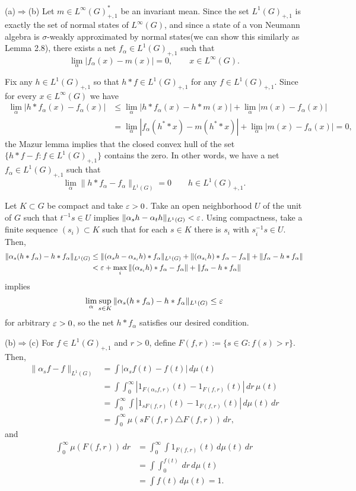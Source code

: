\documentclass{../../../small}
\begin{document}
\begin{pf}
(a)$\Rightarrow$(b)
Let $m\in L^\infty(G)^*_{+,1}$ be an invariant mean.
Since the set $L^1(G)_{+,1}$ is exactly the set of normal states of $L^\infty(G)$, and since a state of a von Neumann algebra is $\sigma$-weakly approximated by normal states(we can show this similarly as Lemma 2.8), there exists a net $f_\alpha\in L^1(G)_{+,1}$ such that
\[\lim_\alpha|f_\alpha(x)-m(x)|=0,\qquad x\in L^\infty(G).\]

Fix any $h\in L^1(G)_{+,1}$ so that $h*f\in L^1(G)_{+,1}$ for any $f\in L^1(G)_{+,1}$.
Since for every $x\in L^\infty(G)$ we have
\begin{align*}
\lim_\alpha|h*f_\alpha(x)-f_\alpha(x)|
&\le\lim_\alpha|h*f_\alpha(x)-h*m(x)|+\lim_\alpha|m(x)-f_\alpha(x)|\\
&=\lim_\alpha|f_\alpha(h^**x)-m(h^**x)|+\lim_\alpha|m(x)-f_\alpha(x)|=0,
\end{align*}
the Mazur lemma implies that the closed convex hull of the set $\{h*f-f:f\in L^1(G)_{+,1}\}$ contains the zero.
In other words, we have a net $f_\alpha\in L^1(G)_{+,1}$ such that
\[\lim_\alpha\|h*f_\alpha-f_\alpha\|_{L^1(G)}=0\qquad h\in L^1(G)_{+,1}.\]

Let $K\subset G$ be compact and take $\varepsilon>0$.
Take an open neighborhood $U$ of the unit of $G$ such that $t^{-1}s\in U$ implies $\|\alpha_sh-\alpha_th\|_{L^1(G)}<\varepsilon$.
Using compactness, take a finite sequence $(s_i)\subset K$ such that for each $s\in K$ there is $s_i$ with $s_i^{-1}s\in U$.
Then,
\begin{align*}
\|\alpha_s(h*f_\alpha)-h*f_\alpha\|_{L^1(G)}
&\le\|(\alpha_sh-\alpha_{s_i}h)*f_\alpha\|_{L^1(G)}+\|(\alpha_{s_i}h)*f_\alpha-f_\alpha\|+\|f_\alpha-h*f_\alpha\|\\
&<\varepsilon+\max_i\|(\alpha_{s_i}h)*f_\alpha-f_\alpha\|+\|f_\alpha-h*f_\alpha\|
\end{align*}
implies
\[\lim_\alpha\sup_{s\in K}\|\alpha_s(h*f_\alpha)-h*f_\alpha\|_{L^1(G)}\le\varepsilon\]
for arbitrary $\varepsilon>0$, so the net $h*f_\alpha$ satisfies our desired condition.

(b)$\Rightarrow$(c)
For $f\in L^1(G)_{+,1}$ and $r>0$, define $F(f,r):=\{s\in G:f(s)>r\}$.
Then,
\begin{align*}
\|\alpha_sf-f\|_{L^1(G)}
&=\int|\alpha_sf(t)-f(t)|\,d\mu(t)\\
&=\int\int_0^\infty|1_{F(\alpha_sf,r)}(t)-1_{F(f,r)}(t)|\,dr\,\mu(t)\\
&=\int_0^\infty\int|1_{sF(f,r)}(t)-1_{F(f,r)}(t)|\,d\mu(t)\,dr\\
&=\int_0^\infty\mu(sF(f,r)\triangle F(f,r))\,dr,
\end{align*}
and
\begin{align*}
\int_0^\infty\mu(F(f,r))\,dr
&=\int_0^\infty\int1_{F(f,r)}(t)\,d\mu(t)\,dr\\
&=\int\int_0^{f(t)}\,dr\,d\mu(t)\\
&=\int f(t)\,d\mu(t)=1.
\end{align*}


\end{pf}
\end{document}
